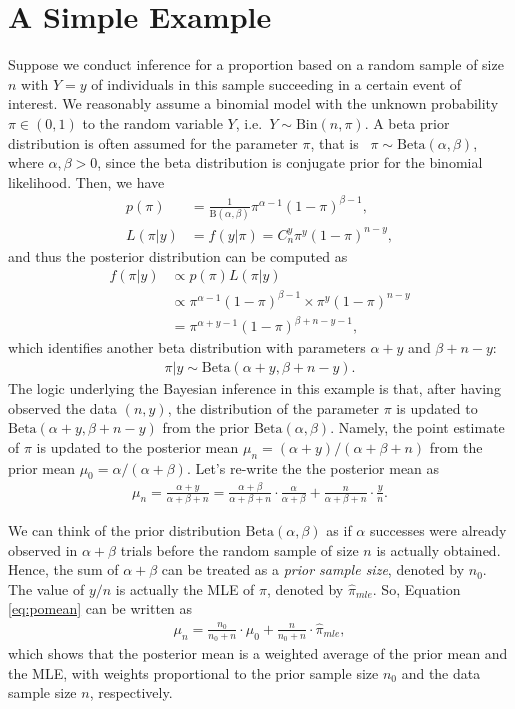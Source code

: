 \documentclass{article}
\numberwithin{equation}{section}
\theoremstyle{plain}
\begin{document}
\section{A Simple Example}
\label{sec:example}
Suppose we conduct inference for a proportion based on a random sample of size $n$ with $Y=y$ of individuals in this sample succeeding in a certain event of interest. We reasonably assume a binomial model with the unknown probability $\pi \in (0,1)$ to the random variable $Y$, i.e.\ $Y \sim \mathrm{Bin}(n, \pi)$. A beta prior distribution is often assumed for the parameter $\pi$, that is \ $\pi \sim \mathrm{Beta}(\alpha, \beta)$, where $\alpha,\beta>0$, since the beta distribution is conjugate prior for the binomial likelihood. Then, we have 
\begin{align*}
    p(\pi)&=\frac{1}{\mathrm{B}(\alpha, \beta)}\pi^{\alpha-1}(1-\pi)^{\beta-1},\\
    L(\pi|y)&=f(y|\pi)=C^y_n\pi^y(1-\pi)^{n-y},
\end{align*}
and thus the posterior distribution can be computed as
\begin{align*}
    f(\pi|y) & \propto p(\pi)L(\pi|y)\\
    &\propto \pi^{\alpha-1}(1-\pi)^{\beta-1} \times \pi^y(1-\pi)^{n-y} \\
          &   = \pi^{\alpha+y-1}(1-\pi)^{\beta+n-y-1},
\end{align*}
which identifies another beta distribution with parameters $\alpha+y$ and $\beta+n-y$:
\begin{align*}
    \pi|y \sim \mathrm{Beta}(\alpha+y, \beta+n-y).
\end{align*}
The logic underlying the Bayesian inference in this example is that, after having observed the data $(n,y)$, the distribution of the parameter $\pi$ is updated to $\mathrm{Beta}(\alpha+y, \beta+n-y)$ from the prior $\mathrm{Beta}(\alpha, \beta)$. Namely, the point estimate of $\pi$ is updated to the posterior mean $\mu_{n}=(\alpha+y)/(\alpha+\beta+n)$ from the prior mean $\mu_{0}=\alpha/(\alpha+\beta)$. Let's re-write the the posterior mean as
\begin{align}\label{eq:pomean}
    \mu_{n}=\frac{\alpha+y}{\alpha+\beta+n}
=\frac{\alpha+\beta}{\alpha+\beta+n}\cdot \frac{\alpha}{\alpha+\beta}+
\frac{n}{\alpha+\beta+n}\cdot \frac{y}{n}.
\end{align}

We can think of the prior distribution $\mathrm{Beta}(\alpha, \beta)$ as if $\alpha$ successes were already observed in $\alpha+\beta$ trials before the random sample of size $n$ is actually obtained. Hence, the sum of $\alpha+\beta$ can be treated as a \textit{prior sample size}, denoted by $n_0$. The value of $y/n$ is actually the MLE of $\pi$, denoted by $\hat{\pi}_{mle}$. So, Equation \eqref{eq:pomean} can be written as
\begin{align}\label{eq:wtmean}
    \mu_n=\frac{n_0}{n_0+n}\cdot\mu_0+\frac{n}{n_0+n}\cdot \hat{\pi}_{mle},
\end{align}
which shows that the posterior mean is a weighted average of the prior mean and the MLE, with weights proportional to the prior sample size $n_0$ and the data sample size $n$, respectively. 
\end{document}
